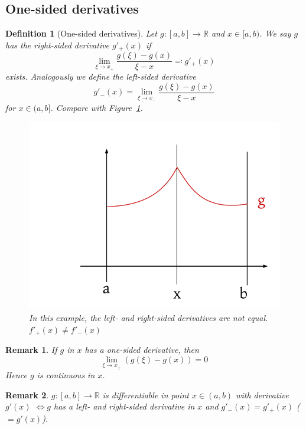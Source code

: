 \documentclass{article}
\newtheorem{definition}{Definition}  \numberwithin{definition}{section}
\newtheorem{remark}{Remark}  \numberwithin{remark}{section}
\begin{document}
\subsection{One-sided derivatives}

\begin{definition}[One-sided derivatives] %
  Let $g: [a,b] \to \mathbb R$ and $x \in [a,b)$.
  We say $g$ has the \emph{right-sided derivative} $g'_+(x)$ if
  \[ \lim_{\xi \to x_+} \frac{g(\xi) - g(x)}{\xi - x} \eqqcolon g'_+(x) \]
  exists. Analogously we define the left-sided derivative
  \[ g'_-(x) = \lim_{\xi \to x_-} \frac{g(\xi) - g(x)}{\xi - x} \]
  for $x \in (a,b]$. Compare with Figure~\ref{img:lrderiv}.

  \begin{figure}[!h]
    \begin{center}
      \includegraphics{img/19_left_right_sided_derivative.pdf}
      \caption{In this example, the left- and right-sided derivatives are not equal. $f'_+(x) \neq f'_-(x)$}
      \label{img:lrderiv}
    \end{center}
  \end{figure}
\end{definition}

\begin{remark}
  If $g$ in $x$ has a one-sided derivative, then
  \[ \lim_{\xi \to x_\pm} (g(\xi) - g(x)) = 0 \]
  Hence $g$ is continuous in $x$.
\end{remark}

\begin{remark}
  $g: [a,b] \to \mathbb R$ is differentiable in point $x \in (a,b)$ with derivative $g'(x)$
  $\iff g$ has a left- and right-sided derivative in $x$ and $g'_-(x) = g'_+(x)$ ($= g'(x)$).
\end{remark}
\end{document}
